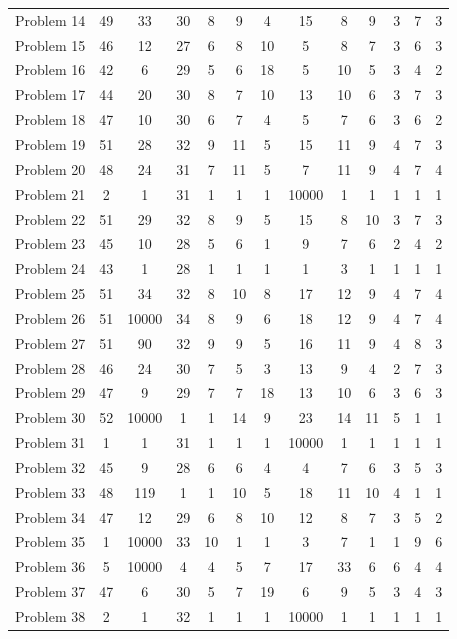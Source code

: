 \documentclass[amsmath, amssymb, aps]{revtex4-2}
\begin{document}
\begin{table}
{\begin{tabular}{lcccccccccccc}
Problem 14 & 49 & 33 & 30 & 8 & 9 & 4 & 15 & 8 & 9 & 3 & 7 & 3  \\
Problem 15 & 46 & 12 & 27 & 6 & 8 & 10 & 5 & 8 & 7 & 3 & 6 & 3  \\
Problem 16 & 42 & 6 & 29 & 5 & 6 & 18 & 5 & 10 & 5 & 3 & 4 & 2  \\
Problem 17 & 44 & 20 & 30 & 8 & 7 & 10 & 13 & 10 & 6 & 3 & 7 & 3  \\
Problem 18 & 47 & 10 & 30 & 6 & 7 & 4 & 5 & 7 & 6 & 3 & 6 & 2  \\
Problem 19 & 51 & 28 & 32 & 9 & 11 & 5 & 15 & 11 & 9 & 4 & 7 & 3  \\
Problem 20 & 48 & 24 & 31 & 7 & 11 & 5 & 7 & 11 & 9 & 4 & 7 & 4  \\
Problem 21 & 2 & 1 & 31 & 1 & 1 & 1 & 10000 & 1 & 1 & 1 & 1 & 1  \\
Problem 22 & 51 & 29 & 32 & 8 & 9 & 5 & 15 & 8 & 10 & 3 & 7 & 3  \\
Problem 23 & 45 & 10 & 28 & 5 & 6 & 1 & 9 & 7 & 6 & 2 & 4 & 2  \\
Problem 24 & 43 & 1 & 28 & 1 & 1 & 1 & 1 & 3 & 1 & 1 & 1 & 1  \\
Problem 25 & 51 & 34 & 32 & 8 & 10 & 8 & 17 & 12 & 9 & 4 & 7 & 4  \\
Problem 26 & 51 & 10000 & 34 & 8 & 9 & 6 & 18 & 12 & 9 & 4 & 7 & 4  \\
Problem 27 & 51 & 90 & 32 & 9 & 9 & 5 & 16 & 11 & 9 & 4 & 8 & 3  \\
Problem 28 & 46 & 24 & 30 & 7 & 5 & 3 & 13 & 9 & 4 & 2 & 7 & 3  \\
Problem 29 & 47 & 9 & 29 & 7 & 7 & 18 & 13 & 10 & 6 & 3 & 6 & 3  \\
Problem 30 & 52 & 10000 & 1 & 1 & 14 & 9 & 23 & 14 & 11 & 5 & 1 & 1  \\
Problem 31 & 1 & 1 & 31 & 1 & 1 & 1 & 10000 & 1 & 1 & 1 & 1 & 1  \\
Problem 32 & 45 & 9 & 28 & 6 & 6 & 4 & 4 & 7 & 6 & 3 & 5 & 3  \\
Problem 33 & 48 & 119 & 1 & 1 & 10 & 5 & 18 & 11 & 10 & 4 & 1 & 1  \\
Problem 34 & 47 & 12 & 29 & 6 & 8 & 10 & 12 & 8 & 7 & 3 & 5 & 2  \\
Problem 35 & 1 & 10000 & 33 & 10 & 1 & 1 & 3 & 7 & 1 & 1 & 9 & 6  \\
Problem 36 & 5 & 10000 & 4 & 4 & 5 & 7 & 17 & 33 & 6 & 6 & 4 & 4  \\
Problem 37 & 47 & 6 & 30 & 5 & 7 & 19 & 6 & 9 & 5 & 3 & 4 & 3  \\
Problem 38 & 2 & 1 & 32 & 1 & 1 & 1 & 10000 & 1 & 1 & 1 & 1 & 1  \\

\end{tabular}}
\end{table}
\end{document}

